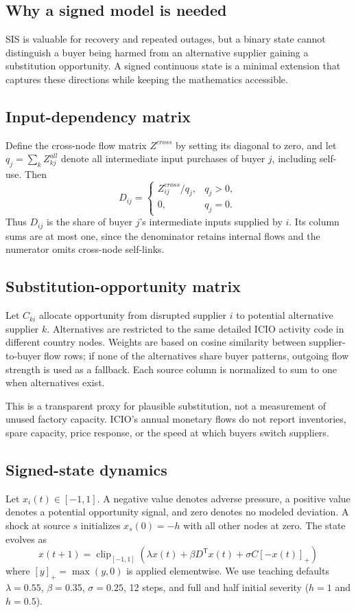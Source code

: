 \documentclass[conference,a4paper,twoside]{IEEEtran}
\begin{document}
\subsection{Why a signed model is needed}
SIS is valuable for recovery and repeated outages, but a binary state cannot distinguish a buyer being harmed from an alternative supplier gaining a substitution opportunity. A signed continuous state is a minimal extension that captures these directions while keeping the mathematics accessible.

\subsection{Input-dependency matrix}
Define the cross-node flow matrix $Z^{cross}$ by setting its diagonal to zero, and let $q_j=\sum_k Z^{all}_{kj}$ denote all intermediate input purchases of buyer $j$, including self-use. Then
\begin{equation}
D_{ij}=\begin{cases}Z^{cross}_{ij}/q_j,&q_j>0,\\0,&q_j=0.\end{cases}
\label{eq:D}
\end{equation}
Thus $D_{ij}$ is the share of buyer $j$'s intermediate inputs supplied by $i$. Its column sums are at most one, since the denominator retains internal flows and the numerator omits cross-node self-links.

\subsection{Substitution-opportunity matrix}
Let $C_{ki}$ allocate opportunity from disrupted supplier $i$ to potential alternative supplier $k$. Alternatives are restricted to the same detailed ICIO activity code in different country nodes. Weights are based on cosine similarity between supplier-to-buyer flow rows; if none of the alternatives share buyer patterns, outgoing flow strength is used as a fallback. Each source column is normalized to sum to one when alternatives exist.

This is a transparent proxy for plausible substitution, not a measurement of unused factory capacity. ICIO's annual monetary flows do not report inventories, spare capacity, price response, or the speed at which buyers switch suppliers.

\subsection{Signed-state dynamics}
Let $x_i(t)\in[-1,1]$. A negative value denotes adverse pressure, a positive value denotes a potential opportunity signal, and zero denotes no modeled deviation. A shock at source $s$ initializes $x_s(0)=-h$ with all other nodes at zero. The state evolves as
\begin{equation}
\boxed{x(t+1)=\operatorname{clip}_{[-1,1]}\!\left(\lambda x(t)+\beta D^{\mathsf T}x(t)+\sigma C[-x(t)]_+\right)}
\label{eq:signed}
\end{equation}
where $[y]_+=\max(y,0)$ is applied elementwise. We use teaching defaults $\lambda=0.55$, $\beta=0.35$, $\sigma=0.25$, 12 steps, and full and half initial severity ($h=1$ and $h=0.5$).
\end{document}
